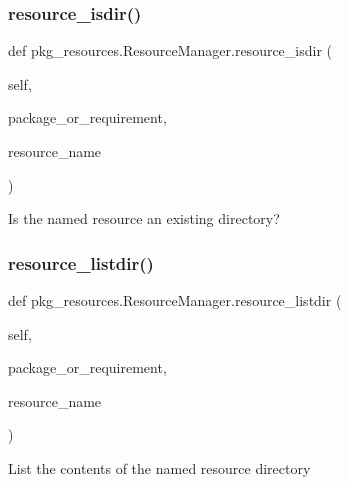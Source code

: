 \subsubsection{\texorpdfstring{resource\+\_\+isdir()}{resource\_isdir()}}
{\footnotesize\ttfamily def pkg\+\_\+resources.\+Resource\+Manager.\+resource\+\_\+isdir (\begin{DoxyParamCaption}\item[{}]{self,  }\item[{}]{package\+\_\+or\+\_\+requirement,  }\item[{}]{resource\+\_\+name }\end{DoxyParamCaption})}

\begin{DoxyVerb}Is the named resource an existing directory?\end{DoxyVerb}
 \mbox{\label{classpkg__resources_1_1_resource_manager_aa613cb6baad8c9bdb748e6592536022d}} 
\subsubsection{\texorpdfstring{resource\+\_\+listdir()}{resource\_listdir()}}
{\footnotesize\ttfamily def pkg\+\_\+resources.\+Resource\+Manager.\+resource\+\_\+listdir (\begin{DoxyParamCaption}\item[{}]{self,  }\item[{}]{package\+\_\+or\+\_\+requirement,  }\item[{}]{resource\+\_\+name }\end{DoxyParamCaption})}

\begin{DoxyVerb}List the contents of the named resource directory\end{DoxyVerb}
 \mbox{\label{classpkg__resources_1_1_resource_manager_a8656d0d38efd4f2afe70595e001838fc}} 
